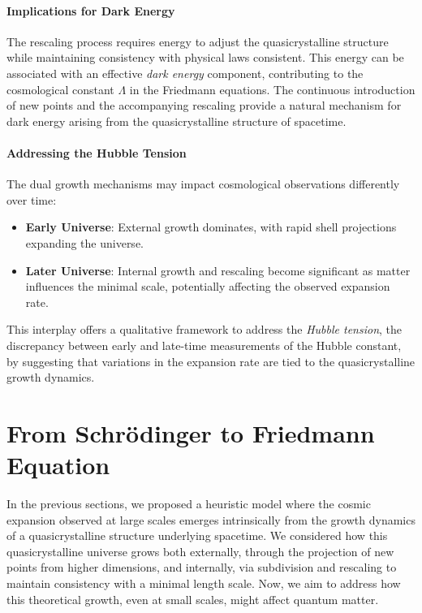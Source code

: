 \documentclass[sn-mathphys-num]{sn-jnl}%
\begin{document}
\paragraph{Implications for Dark Energy}

The rescaling process requires energy to adjust the quasicrystalline structure while maintaining consistency with physical laws consistent. This energy can be associated with an effective \emph{dark energy} component, contributing to the cosmological constant $\Lambda$ in the Friedmann equations. The continuous introduction of new points and the accompanying rescaling provide a natural mechanism for dark energy arising from the quasicrystalline structure of spacetime.

\paragraph{Addressing the Hubble Tension}

The dual growth mechanisms may impact cosmological observations differently over time:

\begin{itemize} \item \textbf{Early Universe}: External growth dominates, with rapid shell projections expanding the universe. \item \textbf{Later Universe}: Internal growth and rescaling become significant as matter influences the minimal scale, potentially affecting the observed expansion rate. \end{itemize}

This interplay offers a qualitative framework to address the \emph{Hubble tension}, the discrepancy between early and late-time measurements of the Hubble constant, by suggesting that variations in the expansion rate are tied to the quasicrystalline growth dynamics.




\section{From Schr{\"o}dinger to Friedmann Equation}
\label{sec:freedmaneqwavefunction}

In the previous sections, we proposed a heuristic model where the cosmic expansion observed at large scales emerges intrinsically from the growth dynamics of a quasicrystalline structure underlying spacetime. We considered how this quasicrystalline universe grows both externally, through the projection of new points from higher dimensions, and internally, via subdivision and rescaling to maintain consistency with a minimal length scale. Now, we aim to address how this theoretical growth, even at small scales, might affect quantum matter.
\end{document}

